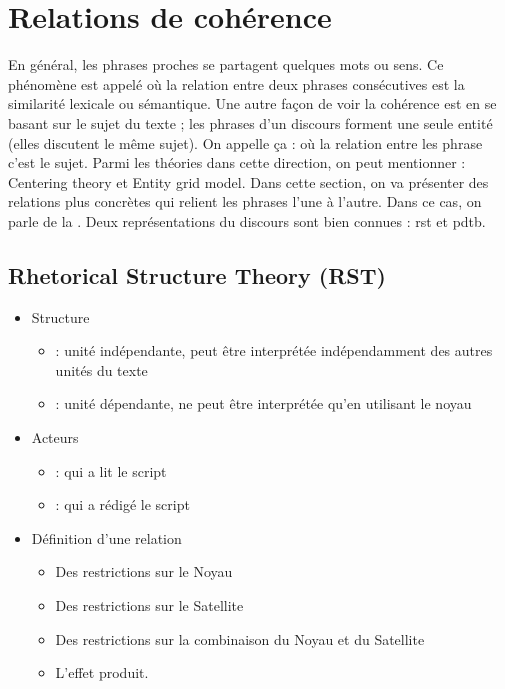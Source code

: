 \documentclass{KodeBook}
\begin{document}
\section{Relations de cohérence}

En général, les phrases proches se partagent quelques mots ou sens. 
Ce phénomène est appelé  où la relation entre deux phrases consécutives est la similarité lexicale ou sémantique.
Une autre façon de voir la cohérence est en se basant sur le sujet du texte ; les phrases d'un discours forment une seule entité (elles discutent le même sujet). 
On appelle ça :  où la relation entre les phrase c'est le sujet. 
Parmi les théories dans cette direction, on peut mentionner : Centering theory et Entity grid model. 
Dans cette section, on va présenter  des relations plus concrètes qui relient les phrases l'une à l'autre. 
Dans ce cas, on parle de la . 
Deux représentations du discours sont bien connues : \ac{rst} et \ac{pdtb}.

\subsection{Rhetorical Structure Theory (RST)}

\begin{itemize}
	\item Structure  
	\begin{itemize}
		\item {} :  unité indépendante, peut être interprétée indépendamment des autres unités du texte
		\item {} :  unité dépendante, ne peut être interprétée qu'en utilisant le noyau
	\end{itemize}
	\item Acteurs
	\begin{itemize}
		\item {} :  qui a lit le script
		\item {} :  qui a rédigé le script
	\end{itemize}
	\item Définition d'une relation
	\begin{itemize}
		\item Des restrictions sur le Noyau 
		\item Des restrictions sur le Satellite 
		\item Des restrictions sur la combinaison du Noyau et du Satellite 
		\item L'effet produit.
	\end{itemize}
\end{itemize}
\end{document}
